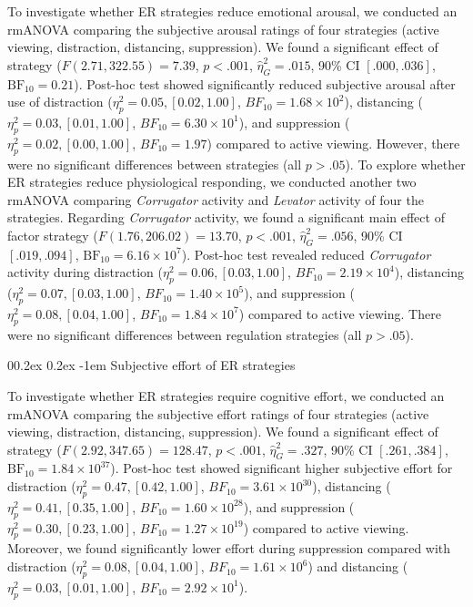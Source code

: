 \documentclass[
  man,floatsintext]{apa6}
\makeatletter
\let\oldparagraph\paragraph
\renewcommand{\paragraph}[1]{\oldparagraph{#1}\mbox{}}
\renewcommand{\paragraph}{\@startsection{paragraph}{4}{\parindent}%
  {0\baselineskip \@plus 0.2ex \@minus 0.2ex}%
  {-1em}%
  {\normalfont\normalsize\bfseries\itshape\typesectitle}}
\makeatother
\begin{document}
To investigate whether ER strategies reduce emotional arousal, we conducted an rmANOVA comparing the subjective arousal ratings of four strategies (active viewing, distraction, distancing, suppression).
We found a significant effect of strategy (\(F(2.71, 322.55) = 7.39\), \(p < .001\), \(\hat{\eta}^2_G = .015\), 90\% CI \([.000, .036]\), \(\mathrm{BF}_{\textrm{10}} = 0.21\)).
Post-hoc test showed significantly reduced subjective arousal after use of distraction (\(\eta_{p}^{2}=0.05, [0.02, 1.00]\), \(BF_{10}=\)\(1.68 \times 10^{2}\)), distancing (\(\eta_{p}^{2}=0.03, [0.01, 1.00]\), \(BF_{10}=\)\(6.30 \times 10^{1}\)), and suppression (\(\eta_{p}^{2}=0.02, [0.00, 1.00]\), \(BF_{10}=\)\(1.97\)) compared to active viewing.
However, there were no significant differences between strategies (all \(p>.05\)).
To explore whether ER strategies reduce physiological responding, we conducted another two rmANOVA comparing \emph{Corrugator} activity and \emph{Levator} activity of four the strategies.
Regarding \emph{Corrugator} activity, we found a significant main effect of factor strategy (\(F(1.76, 206.02) = 13.70\), \(p < .001\), \(\hat{\eta}^2_G = .056\), 90\% CI \([.019, .094]\), \(\mathrm{BF}_{\textrm{10}} = 6.16 \times 10^{7}\)).
Post-hoc test revealed reduced \emph{Corrugator} activity during distraction (\(\eta_{p}^{2}=0.06, [0.03, 1.00]\), \(BF_{10}=\)\(2.19 \times 10^{4}\)), distancing (\(\eta_{p}^{2}=0.07, [0.03, 1.00]\), \(BF_{10}=\)\(1.40 \times 10^{5}\)), and suppression (\(\eta_{p}^{2}=0.08, [0.04, 1.00]\), \(BF_{10}=\)\(1.84 \times 10^{7}\)) compared to active viewing.
There were no significant differences between regulation strategies (all \(p>.05\)).

\hypertarget{subjective-effort-of-er-strategies}{%
\paragraph{Subjective effort of ER strategies}\label{subjective-effort-of-er-strategies}}

To investigate whether ER strategies require cognitive effort, we conducted an rmANOVA comparing the subjective effort ratings of four strategies (active viewing, distraction, distancing, suppression).
We found a significant effect of strategy (\(F(2.92, 347.65) = 128.47\), \(p < .001\), \(\hat{\eta}^2_G = .327\), 90\% CI \([.261, .384]\), \(\mathrm{BF}_{\textrm{10}} = 1.84 \times 10^{37}\)).
Post-hoc test showed significant higher subjective effort for distraction (\(\eta_{p}^{2}=0.47, [0.42, 1.00]\), \(BF_{10}=\)\(3.61 \times 10^{30}\)), distancing (\(\eta_{p}^{2}=0.41, [0.35, 1.00]\), \(BF_{10}=\)\(1.60 \times 10^{28}\)), and suppression (\(\eta_{p}^{2}=0.30, [0.23, 1.00]\), \(BF_{10}=\)\(1.27 \times 10^{19}\)) compared to active viewing.
Moreover, we found significantly lower effort during suppression compared with distraction (\(\eta_{p}^{2}=0.08, [0.04, 1.00]\), \(BF_{10}=\)\(1.61 \times 10^{6}\)) and distancing (\(\eta_{p}^{2}=0.03, [0.01, 1.00]\), \(BF_{10}=\)\(2.92 \times 10^{1}\)).
\end{document}
